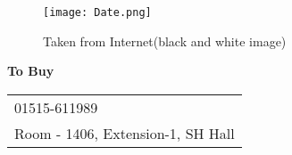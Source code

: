 \documentclass{article}
\begin{document}
\vspace*{\fill}
\begin{center}
  \begin{figure}
  \texttt{[image: Date.png]}
    \caption{Taken from Internet(black and white image)}
  \end{figure}
  {\Huge\textbf{To Buy}}
\\
  \LARGE
\vspace{2cm}
  \begin{tabular}{l}
 \faPhone{} 01515-611989\\
  \faHome{} Room - 1406, Extension-1, SH Hall
  \end{tabular}
\end{center}
\vspace*{\fill}
 
\end{document}

